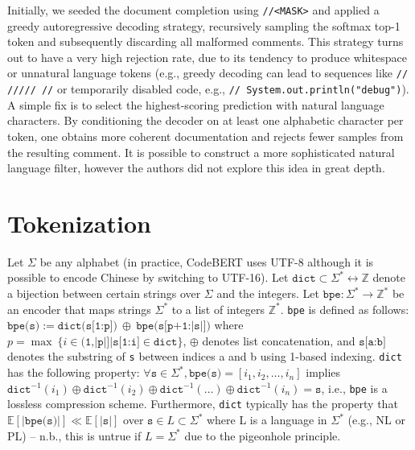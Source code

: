 \documentclass[usenames,dvipsnames]{article} %
\begin{document}
  Initially, we seeded the document completion using \lstinline|//<MASK>| and applied a greedy autoregressive decoding strategy, recursively sampling the softmax top-1 token and subsequently discarding all malformed comments. This strategy turns out to have a very high rejection rate, due to its tendency to produce whitespace or unnatural language tokens (e.g., greedy decoding can lead to sequences like \lstinline|// ///// //| or temporarily disabled code, e.g., \lstinline|// System.out.println("debug")|). A simple fix is to select the highest-scoring prediction with natural language characters. By conditioning the decoder on at least one alphabetic character per token, one obtains more coherent documentation and rejects fewer samples from the resulting comment. It is possible to construct a more sophisticated natural language filter, however the authors did not explore this idea in great depth.

\section{Tokenization}

  Let $\Sigma$ be any alphabet (in practice, CodeBERT uses UTF-8 although it is possible to encode Chinese by switching to UTF-16).
  Let $\texttt{dict} \subset \Sigma^*\leftrightarrow\mathbb Z$ denote a bijection between certain strings over $\Sigma$ and the integers.
  Let $\texttt{bpe}: \Sigma^*\rightarrow\mathbb{Z}^*$ be an encoder that maps strings $\Sigma^*$ to a list of integers $\mathbb{Z}^*$.
  \texttt{bpe} is defined as follows: $\texttt{bpe(s)} := \texttt{dict(s[1:p])}\:\oplus\:\texttt{bpe(s[p+1:|s|])}$ where $p = \max\:\{ i \in \texttt{(1,|p|]} | \texttt{s[1:i]} \in \texttt{dict} \}$, $\oplus$ denotes list concatenation, and $\texttt{s[a:b]}$ denotes the substring of \texttt{s} between indices a and b using 1-based indexing.
  \texttt{dict} has the following property: $\forall \texttt{s} \in \Sigma^*, \texttt{bpe(s)} = [i_1, i_2, \ldots, i_n]$ implies $\texttt{dict}^{-1}(i_1) \oplus \texttt{dict}^{-1}(i_2) \oplus \texttt{dict}^{-1}(\ldots) \oplus \texttt{dict}^{-1}(i_n) = \texttt{s}$, i.e., \texttt{bpe} is a lossless compression scheme.
  Furthermore, \texttt{dict} typically has the property that $\mathbb{E}[|\texttt{bpe(s)}|] \ll \mathbb{E}[|\texttt{s}|]$ over $\texttt{s} \in L \subset \Sigma^*$ where L is a language in $\Sigma^*$ (e.g., NL or PL) -- n.b., this is untrue if $L = \Sigma^*$ due to the pigeonhole principle.
\end{document}
